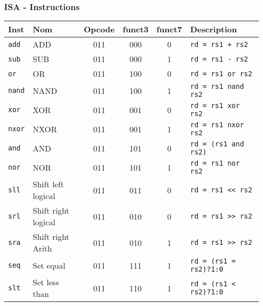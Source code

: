 \documentclass[xcolor=pst,10pt,onlymath]{beamer}
\begin{document}
\footnotesize
\begin{frame}
    \frametitle{ISA - Instructions}
    \begin{longtable}{|l|l|c|c|c|l|}
        \hline
        Inst           & Nom                             & Opcode & funct3 & funct7 & Description                   \\
        \hline
        \texttt{add}   & ADD                             & 011    & 000    & 0      & \texttt{rd = rs1 + rs2}       \\
        \texttt{sub}   & SUB                             & 011    & 000    & 1      & \texttt{rd = rs1 - rs2}       \\
        \texttt{or}    & OR                              & 011    & 100    & 0      & \texttt{rd = rs1 or rs2}      \\
        \texttt{nand}  & NAND                            & 011    & 100    & 1      & \texttt{rd = rs1 nand rs2}    \\
        \texttt{xor}   & XOR                             & 011    & 001    & 0      & \texttt{rd = rs1 xor rs2}     \\
        \texttt{nxor}  & NXOR                            & 011    & 001    & 1      & \texttt{rd = rs1 nxor rs2}    \\
        \texttt{and}   & AND                             & 011    & 101    & 0      & \texttt{rd = (rs1 and rs2)}   \\
        \texttt{nor}   & NOR                             & 011    & 101    & 1      & \texttt{rd = rs1 nor rs2}     \\
        \texttt{sll}   & Shift left logical              & 011    & 011    & 0      & \texttt{rd = rs1 << rs2}      \\
        \texttt{srl}   & Shift right logical             & 011    & 010    & 0      & \texttt{rd = rs1 >> rs2}      \\
        \texttt{sra}   & Shift right Arith               & 011    & 010    & 1      & \texttt{rd = rs1 >> rs2}      \\
        \texttt{seq}   & Set equal                       & 011    & 111    & 1      & \texttt{rd = (rs1 = rs2)?1:0} \\
        \texttt{slt}   & Set less than                   & 011    & 110    & 1      & \texttt{rd = (rs1 < rs2)?1:0} \\
        \hline
    \end{longtable}
\end{frame}
\end{document}
